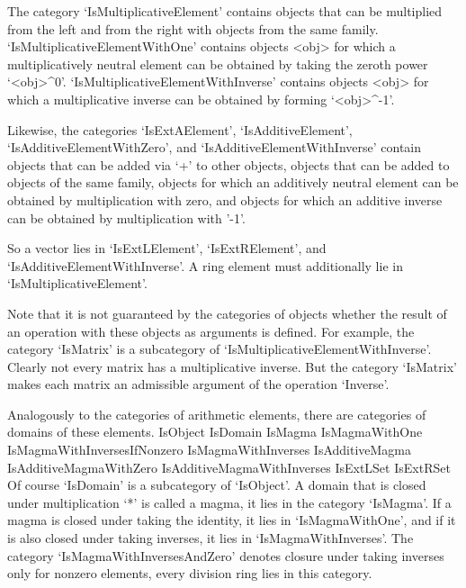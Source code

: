 The category `IsMultiplicativeElement' contains objects that can be
multiplied from the left and from the right with objects from the
same family.
`IsMultiplicativeElementWithOne' contains objects <obj> for which a
multiplicatively neutral element can be obtained by taking the
zeroth power `<obj>^0'.
`IsMultiplicativeElementWithInverse' contains objects <obj> for which a
multiplicative inverse can be obtained by forming `<obj>^-1'.

Likewise, the categories `IsExtAElement', `IsAdditiveElement',
`IsAdditiveElementWithZero', and `IsAdditiveElementWithInverse'
contain objects that can be added via `+' to other objects,
objects that can be added to objects of the same family,
objects for which an additively neutral element can be obtained by
multiplication with zero,
and objects for which an additive inverse can be obtained by
multiplication with '-1'.

So a vector lies in `IsExtLElement', `IsExtRElement', and
`IsAdditiveElementWithInverse'.
A ring element must additionally lie in `IsMultiplicativeElement'.

Note that it is not guaranteed by the categories of objects whether
the result of an operation with these objects as arguments is defined.
For example, the category `IsMatrix' is a subcategory of
`IsMultiplicativeElementWithInverse'.
Clearly not every matrix has a multiplicative inverse.
But the category `IsMatrix' makes each matrix an admissible argument of
the operation `Inverse'.

Analogously to the categories of arithmetic elements,
there are categories of domains of these elements.
\begintt
    IsObject
        IsDomain
            IsMagma
                IsMagmaWithOne
                    IsMagmaWithInversesIfNonzero
                        IsMagmaWithInverses
            IsAdditiveMagma
                IsAdditiveMagmaWithZero
                    IsAdditiveMagmaWithInverses
            IsExtLSet
            IsExtRSet
\endtt
Of course `IsDomain' is a subcategory of `IsObject'.
A domain that is closed under multiplication `*' is called a magma,
it lies in the category `IsMagma'.
If a magma is closed under taking the identity,
it lies in `IsMagmaWithOne',
and if it is also closed under taking inverses,
it lies in `IsMagmaWithInverses'.
The category `IsMagmaWithInversesAndZero' denotes closure under
taking inverses only for nonzero elements,
every division ring lies in this category.

